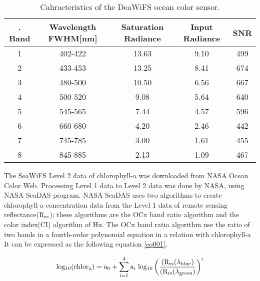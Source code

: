  \begin{table}[h]\textwidth
	\caption{Cahracteristics of the DeaWiFS ocean color sensor.}
	\label{table02}
	\centering
	\begin{tabular}{c|c|c|c|c}
		\hline \setlength{\arrayrulewidth}{0.8pt}. 
		Band	& Wavelength FWHM[nm] & Saturation Radiance & Input Radiance & SNR\\ \hline
		1 & 402-422 & 13.63 & 9.10 & 499 \\ \hline
		2 & 433-453 & 13.25 & 8.41 & 674  \\ \hline
		3 & 480-500 & 10.50 & 6.56 & 667 \\ \hline
		4 & 500-520 & 9.08 & 5.64 & 640  \\ \hline
		5 & 545-565 & 7.44 & 4.57 & 596 \\ \hline
		6 & 660-680 & 4.20 & 2.46 & 442  \\ \hline
		7 & 745-785 & 3.00 & 1.61 & 455 \\ \hline
		8 & 845-885 & 2.13 & 1.09 & 467  \\ \hline

	\end{tabular}
\end{table}
 
 The SeaWiFS Level 2 data of chlorophyll-a was downloaded from NASA Ocean Color Web. Processing Level 1 data to Level 2 data was done by NASA, using NASA SeaDAS program. NASA SeaDAS uses two algorithms to create chlorophyll-a concentration data from the Level 1 data of remote sensing reflectance($\rm R_{rs}$); these algorithms are the OCx band ratio algorithm and the color index(CI) algorithm of Hu. 
 The OCx band ratio algorithm use the ratio of two bands in a fourth-order polynomial equation in a relation with chlorophyll-a It can be expressed as the following equation \ref{eq001}.
 
 \begin{equation}
 {\rm log_{10} (chlor_a) = a_0 + \sum_{i=1}^4 a_i ~ log_{10} \left( \frac{(R_{rs}(\lambda_{blue})}{(R_{rs}(\lambda_{green})} \right) ^i }
 \label{eq001}
 \end{equation}
 
